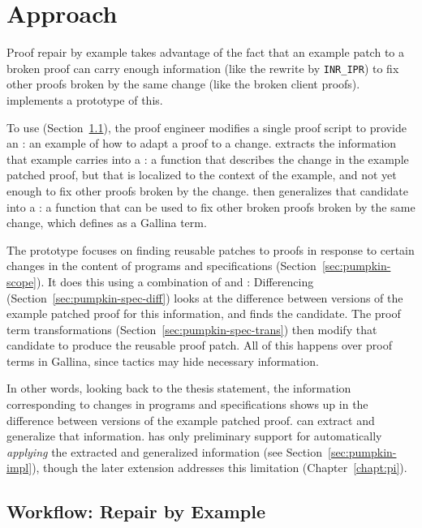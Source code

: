 \section{Approach}
\label{sec:pumpkin-approach}

Proof repair by example takes advantage of the fact that an example patch to a broken proof can carry enough 
information (like the rewrite by \lstinline{INR_IPR}) to fix other proofs broken by the same change (like the broken
client proofs). \sysname implements a prototype of this.

To use \sysname (Section~\ref{sec:pumpkin-workflow}), the proof engineer modifies a single proof script to provide 
an : an example of how to adapt a proof to a change.
\sysname extracts the information that example carries into a : a function that describes the change 
in the example patched proof,
but that is localized to the context of the example, and not yet enough to fix other proofs broken by the change.
\sysname then generalizes that candidate into a : a function
that can be used to fix other broken proofs broken by the same change, which \sysname defines as a Gallina term.

The \sysname prototype focuses on finding reusable patches to proofs in response to certain changes in the content of programs and specifications (Section~\ref{sec:pumpkin-scope}).
It does this using a combination of  and :
Differencing (Section~\ref{sec:pumpkin-spec-diff}) looks at the difference between versions of the example patched proof for this information, and finds the candidate.
The proof term transformations (Section~\ref{sec:pumpkin-spec-trans}) then modify that candidate to produce the reusable proof patch.
All of this happens over proof terms in Gallina, since tactics may hide necessary information. %

In other words, looking back to the thesis statement, the information corresponding to changes in programs and specifications
shows up in the difference between versions of the example patched proof.
\sysname can extract and generalize that information.
\sysname has only preliminary support for automatically \textit{applying} the extracted
and generalized information (see Section~\ref{sec:pumpkin-impl}),
though the later \toolnamec extension addresses this limitation (Chapter~\ref{chapt:pi}).

\subsection{Workflow: Repair by Example}
\label{sec:pumpkin-workflow}

